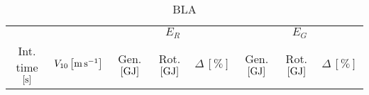 \documentclass[11pt, a4paper]{article}
\begin{document}
\begin{table}[htb]
  \caption{BLA}
  \begin{tabular}{cc|ccc|ccc}
    & & \multicolumn{3}{c|}{$E_R$} & \multicolumn{3}{c}{$E_G$} \\
    Int. time $\left[\si{\second}\right]$ &  $V_{10} \left[\si{\meter\per\second}\right]$ & Gen. $\left[\si{\giga\joule}\right]$ & Rot. $\left[\si{\giga\joule}\right]$ & $\Delta \, \left[\%\right]$ & Gen. $\left[\si{\giga\joule}\right]$ & Rot. $\left[\si{\giga\joule}\right]$ & $\Delta \, \left[\%\right]$ \\ \midrule
    
  \end{tabular}
  \label{tab:energy_K_opt_comp}
\end{table}
\end{document}
